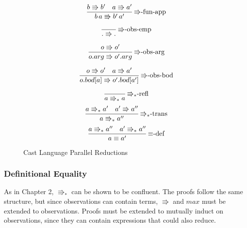 \begin{figure}
\[
\frac{b\Rrightarrow b'\quad a\Rrightarrow a'}{b\,a\Rrightarrow b'\,a'}\,\textrm{\ensuremath{\Rrightarrow}-fun-app}
\]

\[
\frac{\,}{.\Rrightarrow.}\,\textrm{\ensuremath{\Rrightarrow}-obs-emp}
\]

\[
\frac{o\Rrightarrow o'}{o.arg\Rrightarrow o'.arg}\,\textrm{\ensuremath{\Rrightarrow}-obs-arg}
\]

\[
\frac{o\Rrightarrow o'\quad a\Rrightarrow a'}{o.bod[a]\Rrightarrow o'.bod[a']}\,\textrm{\ensuremath{\Rrightarrow}-obs-bod}
\]

\[
\frac{\,}{a\Rrightarrow_{\ast}a}\,\textrm{\ensuremath{\Rrightarrow_{\ast}}-refl}
\]
\[
\frac{a\Rrightarrow_{\ast}a'\quad a'\Rrightarrow a''}{a\Rrightarrow_{\ast}a''}\,\textrm{\ensuremath{\Rrightarrow_{\ast}}-trans}
\]
\[
\frac{a\Rrightarrow_{\ast}a''\quad a'\Rrightarrow_{\ast}a''}{a\equiv a'}\,\textrm{\ensuremath{\equiv}-def}
\]

\caption{Cast Language Parallel Reductions}
\label{fig:cast-reduction}
\end{figure}


\subsubsection{Definitional Equality}


As in Chapter 2, $\Rrightarrow_{*}$ can be shown to be confluent.
The proofs follow the same structure, but since observations can contain
terms, $\Rrightarrow$ and $max$ must be extended to observations.
Proofs must be extended to mutually induct on observations, since
they can contain expressions that could also reduce.

